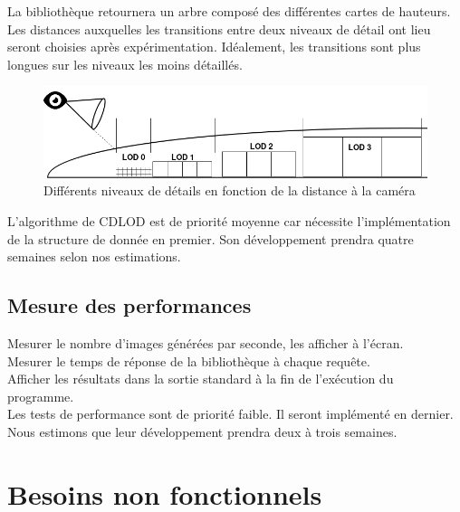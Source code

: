 \documentclass[12pt]{report}
\begin{document}
La bibliothèque retournera un arbre composé des différentes cartes de
hauteurs.\\

Les distances auxquelles les transitions entre deux niveaux de détail
ont lieu seront choisies après expérimentation. Idéalement, les
transitions sont plus longues sur les niveaux les moins détaillés.

\begin{center}
\begin{figure}[!h]
  \includegraphics[scale=0.5]{img/lods.png}
  \caption{Différents niveaux de détails en fonction de la distance à la
  caméra}
  \label{fig:lods}
\end{figure}
\end{center}

L'algorithme de CDLOD est de priorité moyenne car nécessite
l'implémentation de la structure de donnée en premier. Son
développement prendra quatre semaines selon nos estimations.\\

\subsection{Mesure des performances}

Mesurer le nombre d'images générées par seconde, les afficher à l'écran.\\
Mesurer le temps de réponse de la bibliothèque à chaque requête.\\
Afficher les résultats dans la sortie standard à la fin de l'exécution
du programme.\\

Les tests de performance sont de priorité faible. Il seront implémenté
en dernier. Nous estimons que leur développement prendra deux à trois
semaines.\\


\newpage
\section{Besoins non fonctionnels}
\end{document}
